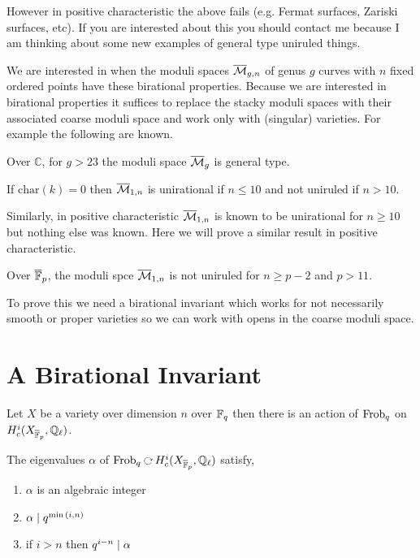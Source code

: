 \documentclass[12pt]{article}
\renewcommand{\C}{\mathbb{C}}
\begin{document}
\begin{rmk}
However in positive characteristic the above fails (e.g. Fermat surfaces, Zariski surfaces, etc). If you are interested about this you should contact me because I am thinking about some new examples of general type uniruled things. 
\end{rmk}

\noindent
We are interested in when the moduli spaces $\overline{\mathcal{M}}_{g,n}$ of genus $g$ curves with $n$ fixed ordered points have these birational properties. Because we are interested in birational properties it suffices to replace the stacky moduli spaces with their associated coarse moduli space and work only with (singular) varieties. For example the following are known.

\begin{thm}
Over $\C$, for $g > 23$ the moduli space $\overline{\mathcal{M}}_{g}$ is general type.
\end{thm}

\begin{thm}
If $\mathrm{char}(k) = 0$ then $\overline{\mathcal{M}}_{1,n}$ is unirational if $n \le 10$ and not uniruled if $n > 10$.
\end{thm}

\noindent
Similarly, in positive characteristic $\overline{\mathcal{M}}_{1,n}$ is known to be unirational for $n \ge 10$ but nothing else was known. Here we will prove a similar result in positive characteristic.

\begin{thm}
Over $\overline{\mathbb{F}}_p$, the moduli spce $\overline{\mathcal{M}}_{1,n}$ is not uniruled for $n \ge p - 2$ and $p > 11$.
\end{thm}

\noindent To prove this we need a birational invariant which works for not necessarily smooth or proper varieties so we can work with opens in the coarse moduli space. 

\section{A Birational Invariant}

Let $X$ be a variety over dimension $n$ over $\mathbb{F}_q$ then there is an action of $\mathrm{Frob}_q$ on $H^i_c(X_{\overline{\mathbb{F}}_p}, \mathbb{Q}_\ell)$. 

\begin{thm}[Deligne]
The eigenvalues $\alpha$ of $\Frob_q \acts H^i_c(X_{\barF_p}, \Q_\ell)$ satisfy,
\begin{enumerate}
\item $\alpha$ is an algebraic integer
\item $\alpha \mid q^{\min{\left(i, n\right)}}$ 
\item if $i > n$ then $q^{i-n} \mid \alpha$
\end{enumerate}
\end{thm}
\end{document}
